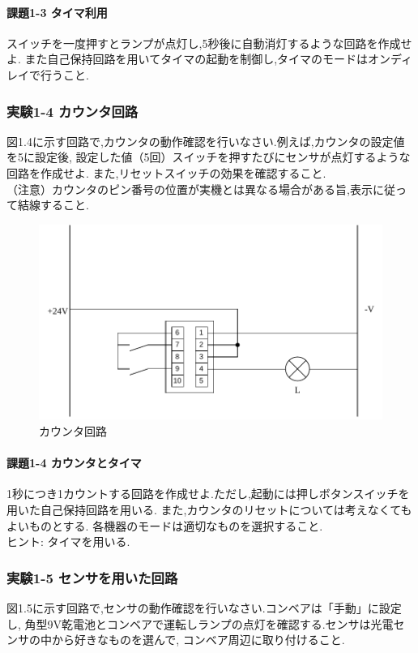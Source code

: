 \paragraph{課題1-3 タイマ利用}
スイッチを一度押すとランプが点灯し,5秒後に自動消灯するような回路を作成せよ.
また自己保持回路を用いてタイマの起動を制御し,タイマのモードはオンディレイで行うこと.\\

\subsubsection{実験1-4 カウンタ回路}
図1.4に示す回路で,カウンタの動作確認を行いなさい.例えば,カウンタの設定値を5に設定後,
設定した値（5回）スイッチを押すたびにセンサが点灯するような回路を作成せよ.
また,リセットスイッチの効果を確認すること.\\
（注意）カウンタのピン番号の位置が実機とは異なる場合がある旨,表示に従って結線すること.

\begin{figure}[H]
  \centering
  \includegraphics[scale=0.5]{sozai/3.pdf}
  \caption{カウンタ回路}
\end{figure}

\paragraph{課題1-4 カウンタとタイマ}
1秒につき1カウントする回路を作成せよ.ただし,起動には押しボタンスイッチを用いた自己保持回路を用いる.
また,カウンタのリセットについては考えなくてもよいものとする.
各機器のモードは適切なものを選択すること.\\
ヒント: タイマを用いる.

\subsubsection{実験1-5 センサを用いた回路}
図1.5に示す回路で,センサの動作確認を行いなさい.コンベアは「手動」に設定し,
角型9V乾電池とコンベアで運転しランプの点灯を確認する.センサは光電センサの中から好きなものを選んで,
コンベア周辺に取り付けること.

